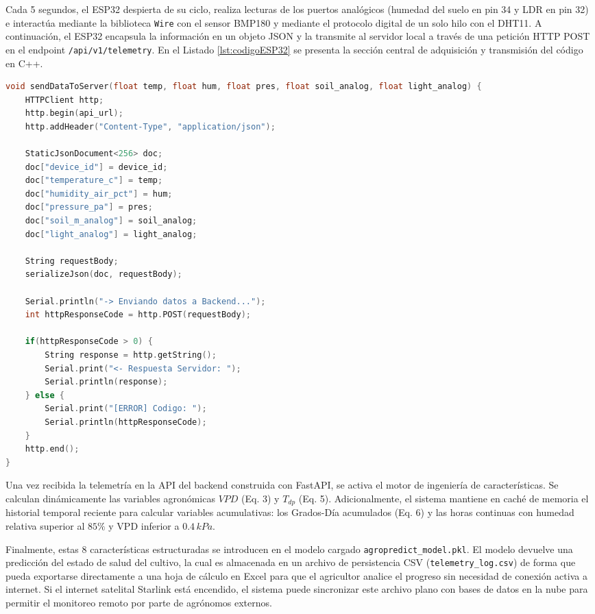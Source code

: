 \documentclass[a4paper, 11pt]{article}
\begin{document}
\begin{multicols}{2}
Cada 5 segundos, el ESP32 despierta de su ciclo, realiza lecturas de los puertos analógicos (humedad del suelo en pin 34 y LDR en pin 32) e interactúa mediante la biblioteca \texttt{Wire} con el sensor BMP180 y mediante el protocolo digital de un solo hilo con el DHT11. A continuación, el ESP32 encapsula la información en un objeto JSON y la transmite al servidor local a través de una petición HTTP POST en el endpoint \texttt{/api/v1/telemetry}. En el Listado \ref{lst:codigoESP32} se presenta la sección central de adquisición y transmisión del código en C++.

\begin{lstlisting}[language=C++, caption={Función de envío de datos del ESP32 mediante HTTP POST.}, label={lst:codigoESP32}]
void sendDataToServer(float temp, float hum, float pres, float soil_analog, float light_analog) {
    HTTPClient http;
    http.begin(api_url);
    http.addHeader("Content-Type", "application/json");

    StaticJsonDocument<256> doc;
    doc["device_id"] = device_id;
    doc["temperature_c"] = temp;
    doc["humidity_air_pct"] = hum;
    doc["pressure_pa"] = pres;
    doc["soil_m_analog"] = soil_analog;
    doc["light_analog"] = light_analog;

    String requestBody;
    serializeJson(doc, requestBody);

    Serial.println("-> Enviando datos a Backend...");
    int httpResponseCode = http.POST(requestBody);

    if(httpResponseCode > 0) {
        String response = http.getString();
        Serial.print("<- Respuesta Servidor: ");
        Serial.println(response); 
    } else {
        Serial.print("[ERROR] Codigo: ");
        Serial.println(httpResponseCode);
    }
    http.end();
}
\end{lstlisting}

Una vez recibida la telemetría en la API del backend construida con FastAPI, se activa el motor de ingeniería de características. Se calculan dinámicamente las variables agronómicas $VPD$ (Eq. 3) y $T_{dp}$ (Eq. 5). Adicionalmente, el sistema mantiene en caché de memoria el historial temporal reciente para calcular variables acumulativas: los Grados-Día acumulados (Eq. 6) y las horas continuas con humedad relativa superior al $85\%$ y VPD inferior a $0.4\,kPa$.

Finalmente, estas 8 características estructuradas se introducen en el modelo cargado \texttt{agropredict\_model.pkl}. El modelo devuelve una predicción del estado de salud del cultivo, la cual es almacenada en un archivo de persistencia CSV (\texttt{telemetry\_log.csv}) de forma que pueda exportarse directamente a una hoja de cálculo en Excel para que el agricultor analice el progreso sin necesidad de conexión activa a internet. Si el internet satelital Starlink está encendido, el sistema puede sincronizar este archivo plano con bases de datos en la nube para permitir el monitoreo remoto por parte de agrónomos externos.


\end{multicols}
\end{document}
